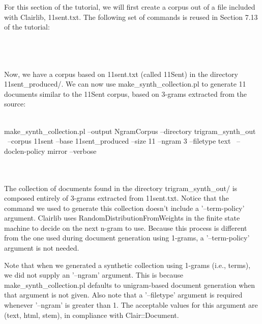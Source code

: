 For this section of the tutorial, we will first create a corpus out of a file included with Clairlib, 11sent.txt. The following set of commands is reused in Section 7.13 of the tutorial:
\\
\\
\\
\\
Now, we have a corpus based on 11sent.txt (called 11Sent) in the directory 11sent\_produced/. We can now use make\_synth\_collection.pl to generate 11 documents similar to the 11Sent corpus, based on 3-grams extracted from the source:
\\
\\
\begin{boxedverbatim}
make_synth_collection.pl --output NgramCorpus --directory trigram_synth_out \
--corpus 11sent --base 11sent_produced --size 11 --ngram 3 --filetype text \
--doclen-policy mirror --verbose
\end{boxedverbatim}
\\
\\
The collection of documents found in the directory trigram\_synth\_out/ is composed entirely of 3-grams extracted from 11sent.txt. Notice that the command we used to generate this collection doesn't include a '--term-policy' argument. Clairlib uses RandomDistributionFromWeights in the finite state machine to decide on the next n-gram to use. Because this process is different from the one used during document generation using 1-grams, a '--term-policy' argument is not needed.

Note that when we generated a synthetic collection using 1-grams (i.e., terms), we did not supply an '--ngram' argument. This is because make\_synth\_collection.pl defaults to unigram-based document generation when that argument is not given. Also note that a '--filetype' argument is required whenever '--ngram' is greater than 1. The acceptable values for this argument are (text, html, stem), in compliance with Clair::Document. 
